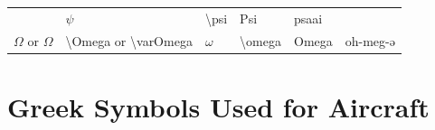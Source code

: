 \documentclass[
]{book}
\begin{document}
\begin{longtable}[]{@{}llllll@{}}
\begin{minipage}[t]{0.17\columnwidth}
\end{minipage} & \begin{minipage}[t]{0.18\columnwidth}\raggedright
\(\psi\)\strut
\end{minipage} & \begin{minipage}[t]{0.17\columnwidth}\raggedright
\textbackslash psi\strut
\end{minipage} & \begin{minipage}[t]{0.06\columnwidth}\raggedright
Psi\strut
\end{minipage} & \begin{minipage}[t]{0.08\columnwidth}\raggedright
psaai\strut
\end{minipage}\tabularnewline
\begin{minipage}[t]{0.18\columnwidth}\raggedright
\(\Omega\) or \(\varOmega\)\strut
\end{minipage} & \begin{minipage}[t]{0.17\columnwidth}\raggedright
\textbackslash Omega or \textbackslash varOmega\strut
\end{minipage} & \begin{minipage}[t]{0.18\columnwidth}\raggedright
\(\omega\)\strut
\end{minipage} & \begin{minipage}[t]{0.17\columnwidth}\raggedright
\textbackslash omega\strut
\end{minipage} & \begin{minipage}[t]{0.06\columnwidth}\raggedright
Omega\strut
\end{minipage} & \begin{minipage}[t]{0.08\columnwidth}\raggedright
oh-meg-ə\strut
\end{minipage}\tabularnewline
\bottomrule
\end{longtable}

\hypertarget{greek-symbols-used-for-aircraft}{%
\section{Greek Symbols Used for Aircraft}\label{greek-symbols-used-for-aircraft}}
\end{document}
